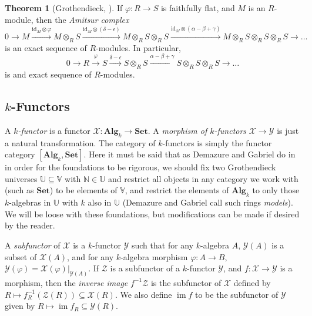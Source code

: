 \documentclass[oneside,11pt]{amsart}
\newcommand{\nn}{\ensuremath{\mathbb{N}}}
\newcommand{\bSet}{\ensuremath{\textbf{Set}}}
\newcommand{\bAlg}{\ensuremath{\textbf{Alg}}}
\newcommand{\mX}{\ensuremath{\mathcal{X}}}
\newcommand{\mY}{\ensuremath{\mathcal{Y}}}
\newcommand{\mZ}{\ensuremath{\mathcal{Z}}}
\newcommand{\id}{\ensuremath{\text{id}}}
\newcommand{\im}{\operatorname{im}}
\theoremstyle{definition}
\newtheorem{proof techniques}{Proof Techniques}
\newtheorem{theorem}{Theorem}
\begin{document}
\begin{theorem}[Grothendieck, \cite{grothendieck1962}] \label{thm: amitsur complex is exact for faithfully flat homomorphisms}
If $\varphi : R \to S$ is faithfully flat, and $M$ is an $R$-module, then the \emph{Amitsur complex}
\begin{equation*}
0 \to M \overset{\id_M \otimes \varphi}{\longrightarrow} M \otimes_R S \overset{\id_M \otimes (\delta - \epsilon)}{\longrightarrow} M \otimes_R S \otimes_R S \overset{\id_M \otimes (\alpha - \beta + \gamma)}{\longrightarrow} M \otimes_R S \otimes_R S \otimes_R S \to \ldots
\end{equation*}
is an exact sequence of $R$-modules. In particular, 
\begin{equation*}
0 \to R \overset{\varphi}{\to} S \overset{\delta - \epsilon}{\longrightarrow} S \otimes_R S \overset{\alpha - \beta + \gamma}{\longrightarrow} S \otimes_R S \otimes_R S \to \ldots
\end{equation*}
is and exact sequence of $R$-modules. 
\end{theorem} 


\subsection{$k$-Functors}

A \emph{$k$-functor} is a functor $\mX: \bAlg_k \to \bSet$. A \emph{morphism of $k$-functors} $\mX \to \mY$ is just a natural transformation. The category of $k$-functors is simply the functor category $[\bAlg_k , \bSet]$. Here it must be said that as Demazure and Gabriel do in \cite{demazure-gabriel1970} in order for the foundations to be rigorous, we should fix two Grothendieck universes $\mathbb{U} \subseteq \mathbb{V}$ with $\nn \in \mathbb{U}$ and restrict all objects in any category we work with (such as $\bSet$) to be elements of $\mathbb{V}$, and restrict the elements of $\bAlg_k$ to only those $k$-algebras in $\mathbb{U}$ with $k$ also in $\mathbb{U}$ (Demazure and Gabriel call such rings \emph{models}). We will be loose with these foundations, but modifications can be made if desired by the reader. 



A \emph{subfunctor} of $\mX$ is a $k$-functor $\mY$ such that for any $k$-algebra $A$, $\mY(A)$ is a subset of $\mX(A)$, and for any $k$-algebra morphism $\varphi: A \to B$, $\mY(\varphi) = \mX(\varphi)|_{\mY(A)}$. If $\mZ$ is a subfunctor of a $k$-functor $\mY$, and $f : \mX \to \mY$ is a morphism, then the \emph{inverse image} $f^{-1}\mZ$ is the subfunctor of $\mX$ defined by $R \mapsto f_R^{-1}(\mZ(R)) \subseteq \mX(R)$. We also define $\im f$ to be the subfunctor of $\mY$ given by $R \mapsto \im f_R \subseteq \mY(R)$. 
\end{document}
